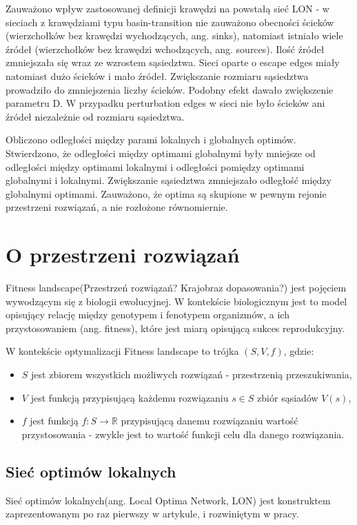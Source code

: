 Zauważono wpływ zastosowanej definicji krawędzi na powstałą sieć LON - w sieciach z krawędziami typu
basin-transition nie zauważono obecności ścieków (wierzchołków bez krawędzi wychodzących, ang. sinks),
natomiast istniało wiele źródeł (wierzchołków bez krawędzi wchodzących, ang. sources).
Ilość źródeł zmniejszała się wraz ze wzrostem sąsiedztwa.
Sieci oparte o escape edges miały natomiast dużo ścieków i mało źródeł.
Zwiększanie rozmiaru sąsiedztwa prowadziło do zmniejszenia liczby ścieków.
Podobny efekt dawało zwiększenie parametru D.
W przypadku perturbation edges w sieci nie było ścieków ani źródeł niezależnie od rozmiaru sąsiedztwa.

Obliczono odległości między parami lokalnych i globalnych optimów.
Stwierdzono, że odległości między optimami globalnymi były mniejsze od odległości między optimami lokalnymi
i odległości pomiędzy optimami globalnymi i lokalnymi.
Zwiększanie sąsiedztwa zmniejszało odległość między globalnymi optimami.
Zauważono, że optima są skupione w pewnym rejonie przestrzeni rozwiązań, a nie rozłożone równomiernie.



\section{O przestrzeni rozwiązań}
Fitness landscape(Przestrzeń rozwiązań? Krajobraz dopasowania?) jest pojęciem wywodzącym się z biologii ewolucyjnej.
W kontekście biologicznym jest to model opisujący relację między genotypem i fenotypem organizmów, a ich przystosowaniem (ang. fitness),
które jest miarą opisującą sukces reprodukcyjny\cite{FRAGATA201969}.

W kontekście optymalizacji Fitness landscape to trójka $(S, V, f)$, gdzie:
\begin{itemize}
      \item $S$ jest zbiorem wszystkich możliwych rozwiązań - przestrzenią przeszukiwania,
      \item $V$ jest funkcją przypisującą każdemu rozwiązaniu $s\in{S}$ zbiór sąsiadów $V(s)$,
      \item $f$ jest funkcją $f:S \rightarrow \mathbb{R}$ przypisującą danemu rozwiązaniu wartość przystosowania
            - zwykle jest to wartość funkcji celu dla danego rozwiązania.
\end{itemize}

\subsection{Sieć optimów lokalnych}
Sieć optimów lokalnych(ang. Local Optima Network, LON) jest konstruktem zaprezentowanym po raz pierwszy w artykule\cite{PhysRevE.78.066114},
i rozwiniętym w pracy\cite{DBLP:journals/corr/OchoaVDT14}.

